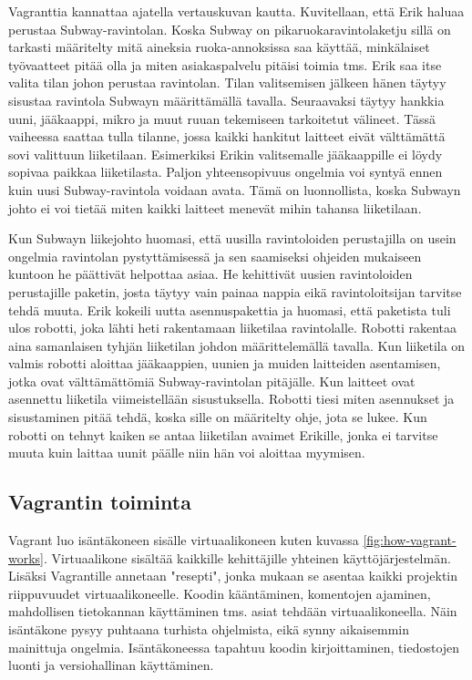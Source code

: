 Vagranttia kannattaa ajatella vertauskuvan kautta. Kuvitellaan, että Erik haluaa perustaa Subway-ravintolan. Koska Subway on pikaruokaravintolaketju sillä on tarkasti määritelty mitä aineksia ruoka-annoksissa saa käyttää, minkälaiset työvaatteet pitää olla ja miten asiakaspalvelu pitäisi toimia tms. Erik saa itse valita tilan johon perustaa ravintolan. Tilan valitsemisen jälkeen hänen täytyy sisustaa ravintola Subwayn määrittämällä tavalla. Seuraavaksi täytyy hankkia uuni, jääkaappi, mikro ja muut ruuan tekemiseen tarkoitetut välineet. Tässä vaiheessa saattaa tulla tilanne, jossa kaikki hankitut laitteet eivät välttämättä sovi valittuun liiketilaan. Esimerkiksi Erikin valitsemalle jääkaappille ei löydy sopivaa paikkaa liiketilasta. Paljon yhteensopivuus ongelmia voi syntyä ennen kuin uusi Subway-ravintola voidaan avata. Tämä on luonnollista, koska Subwayn johto ei voi tietää miten kaikki laitteet menevät mihin tahansa liiketilaan.

Kun Subwayn liikejohto huomasi, että uusilla ravintoloiden perustajilla on usein ongelmia ravintolan pystyttämisessä ja sen saamiseksi ohjeiden mukaiseen kuntoon he päättivät helpottaa asiaa. He kehittivät uusien ravintoloiden perustajille paketin, josta täytyy vain painaa nappia eikä ravintoloitsijan tarvitse tehdä muuta. Erik kokeili uutta asennuspakettia ja huomasi, että paketista tuli ulos robotti, joka lähti heti rakentamaan liiketilaa ravintolalle. Robotti rakentaa aina samanlaisen tyhjän liiketilan johdon määrittelemällä tavalla. Kun liiketila on valmis robotti aloittaa jääkaappien, uunien ja muiden laitteiden asentamisen, jotka ovat välttämättömiä Subway-ravintolan pitäjälle. Kun laitteet ovat asennettu liiketila viimeistellään sisustuksella. Robotti tiesi miten asennukset ja sisustaminen pitää tehdä, koska sille on määritelty ohje, jota se lukee. Kun robotti on tehnyt kaiken se antaa liiketilan avaimet Erikille, jonka ei tarvitse muuta kuin laittaa uunit päälle niin hän voi aloittaa myymisen.

\subsection{Vagrantin toiminta}
Vagrant luo isäntäkoneen sisälle virtuaalikoneen kuten kuvassa \ref{fig:how-vagrant-works}. Virtuaalikone sisältää kaikkille kehittäjille yhteinen käyttöjärjestelmän. Lisäksi Vagrantille annetaan "resepti", jonka mukaan se asentaa kaikki projektin riippuvuudet virtuaalikoneelle. Koodin kääntäminen, komentojen ajaminen, mahdollisen tietokannan käyttäminen tms. asiat tehdään virtuaalikoneella. Näin isäntäkone pysyy puhtaana turhista ohjelmista, eikä synny aikaisemmin mainittuja ongelmia. Isäntäkoneessa tapahtuu koodin kirjoittaminen, tiedostojen luonti ja versiohallinan käyttäminen.

